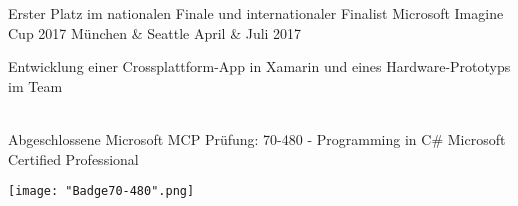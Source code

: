 




\begin{cvhonors}

\cventry
{Erster Platz im nationalen Finale und internationaler Finalist} %
{Microsoft Imagine Cup 2017} %
{München \& Seattle} %
{April \& Juli 2017} %
{ %
\begin{cvitems}
\item {Entwicklung einer Crossplattform-App in Xamarin und eines Hardware-Prototyps im Team}
\end{cvitems}
}
\\
\cventry
{Abgeschlossene Microsoft MCP Prüfung: 70-480 - Programming in C\#} %
{Microsoft Certified Professional} %
{} %
{} %
{ %
\begin{cvitems}
\item[]{\texttt{[image: "Badge70-480".png]}}
\end{cvitems}
}
\iffalse
\cventry
{Abgeschlossene Microsoft MCP Prüfungen} %
{Microsoft Certified Professional} %
{} %
{} %
{ %
\begin{cvitems}
\item {MCP 70-480 - Programming in C\#}
\item {MCP 70-486 - Developing ASP.NET MVC Web Applications}
\item[]{\texttt{[image: "Badge70-480".png]}\texttt{[image: "Badge70-486".png]}}
\end{cvitems}
}
\fi
\end{cvhonors}